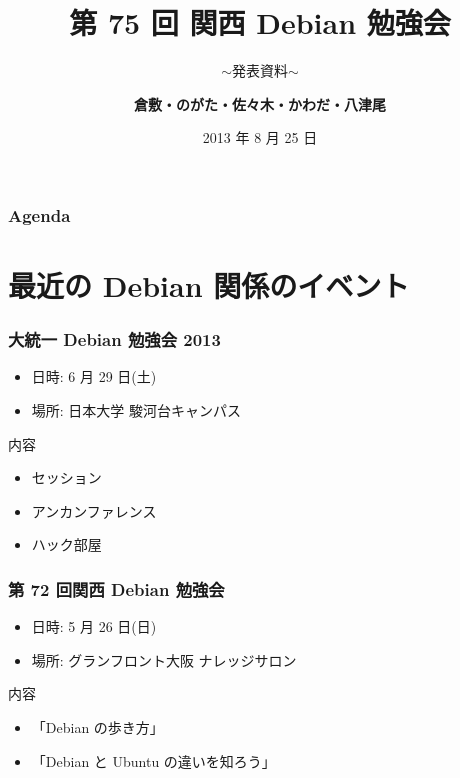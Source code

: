 \documentclass[cjk,dvipdfmx,10pt,compress,%
hyperref={bookmarks=true,bookmarksnumbered=true,bookmarksopen=false,%
colorlinks=false,%
pdftitle={第 75 回 関西 Debian 勉強会},%
pdfauthor={倉敷・のがた・佐々木・かわだ・八津尾},%
pdfsubject={資料},%
}]{beamer}
\title{第 75 回 関西 Debian 勉強会}
\subtitle{$\sim$発表資料$\sim$}
\author[かわだ てつたろう]{{\large\bf 倉敷・のがた・佐々木・かわだ・八津尾}}
\institute[Debian JP]{{\normalsize\tt 関西 Debian 勉強会}}
\date{{\small 2013 年 8 月 25 日}}
\begin{document}
\settitleslide
\begin{frame}
\titlepage
\end{frame}
\setdefaultslide

\begin{frame}[fragile]
\frametitle{Agenda}

\tableofcontents

\end{frame}

\section{最近の Debian 関係のイベント}


\begin{frame}[fragile]
  \frametitle{大統一 Debian 勉強会 2013}
  \begin{itemize}
  \item 日時: 6 月 29 日(土)
  \item 場所: 日本大学 駿河台キャンパス
  \end{itemize}
  \begin{block}{内容}
    \begin{itemize}
    \item セッション
    \item アンカンファレンス
    \item ハック部屋
    \end{itemize}
  \end{block}
\end{frame}

\begin{frame}[fragile]
  \frametitle{第 72 回関西 Debian 勉強会}
  \begin{itemize}
  \item 日時: 5 月 26 日(日)
  \item 場所: グランフロント大阪 ナレッジサロン
  \end{itemize}
  \begin{block}{内容}
    \begin{itemize}
    \item 「Debian の歩き方」
    \item 「Debian と Ubuntu の違いを知ろう」
    \end{itemize}
  \end{block}
\end{frame}
\end{document}
